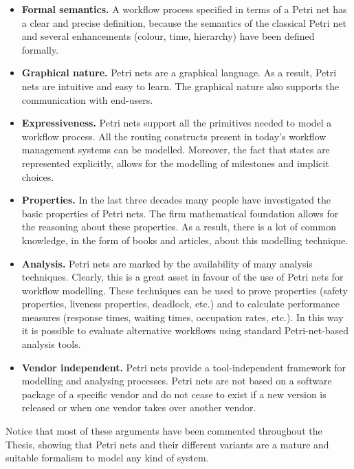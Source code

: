\begin{itemize}
\item {\bf Formal semantics.}
A workflow process specified in terms of a Petri net has a clear and precise
definition, because the semantics of the classical Petri net and several 
enhancements (colour, time, hierarchy) have been defined formally.

\item {\bf Graphical nature.}
Petri nets are a graphical language. As a result, Petri nets are intuitive and
easy to learn. The graphical nature also supports the communication with
end-users.

\item {\bf Expressiveness.}
Petri nets support all the primitives needed to model a workflow process. All
the routing constructs present in today’s workflow management systems can
be modelled. Moreover, the fact that states are represented explicitly, allows
for the modelling of milestones and implicit choices.

\item {\bf Properties.}
In the last three decades many people have investigated the basic properties
of Petri nets. The firm mathematical foundation allows for the reasoning
about these properties. As a result, there is a lot of common knowledge, in
the form of books and articles, about this modelling technique.

\item {\bf Analysis.}
Petri nets are marked by the availability of many analysis techniques. Clearly,
this is a great asset in favour of the use of Petri nets for workflow modelling.
These techniques can be used to prove properties (safety properties, 
liveness properties, deadlock, etc.) and to calculate performance measures 
(response times, waiting times, occupation rates, etc.). In this way it is possible
to evaluate alternative workflows using standard Petri-net-based analysis
tools.

\item {\bf Vendor independent.}
Petri nets provide a tool-independent framework for modelling and analysing
processes. Petri nets are not based on a software package of a specific vendor
and do not cease to exist if a new version is released or when one vendor takes
over another vendor.

\end{itemize}

Notice that most of these arguments have been commented throughout the Thesis, showing that
Petri nets and their different variants are a mature and suitable formalism to model any kind
of system.

